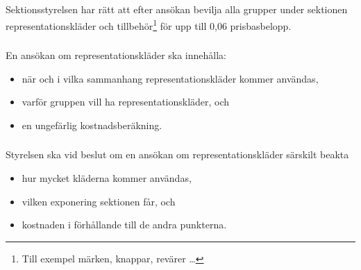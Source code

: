 \documentclass[a4paper, 10pt]{article}
\begin{document}
\subsection{}
Sektionsstyrelsen har rätt att efter ansökan bevilja alla grupper under
sektionen representationskläder och tillbehör\footnote{Till exempel märken,
knappar, revärer \dots} för upp till 0,06 prisbasbelopp.

\subsubsection{}
En ansökan om representationskläder ska innehålla:
\begin{itemize}
  \item när och i vilka sammanhang representationskläder kommer användas,
  \item varför gruppen vill ha representationskläder, och
  \item en ungefärlig kostnadsberäkning.
\end{itemize}
\subsubsection{}
Styrelsen ska vid beslut om en ansökan om representationskläder särskilt beakta
\begin{itemize}
  \item hur mycket kläderna kommer användas,
  \item vilken exponering sektionen får, och
  \item kostnaden i förhållande till de andra punkterna.
\end{itemize}
\end{document}
